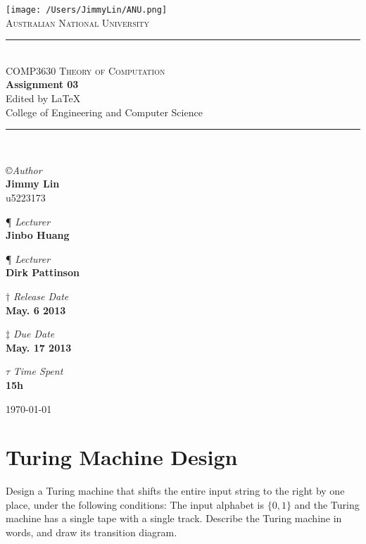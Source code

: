 \documentclass[11pt,a4paper]{article}
\newcommand{\AUTHOR}{Jimmy Lin}
\newcommand{\UID}{u5223173}
\newcommand{\UNIVERSITY}{Australian National University}
\newcommand{\COLLEGE}{College of Engineering and Computer Science}
\newcommand{\COURSE}{COMP3630 Theory of Computation}
\newcommand{\LECTURER}{Jinbo Huang}
\newcommand{\LECTURERt}{Dirk Pattinson}
\newcommand{\TASK}{Assignment 03}
\newcommand{\RELEASEDATE}{May. 6 2013}
\newcommand{\DUEDATE}{May. 17 2013}
\newcommand{\TIMECONSUME}{15h}
\begin{document}
\begin{titlepage}
    \begin{center}
        \vspace*{0.8cm}
\texttt{[image: /Users/JimmyLin/ANU.png]}\\[1cm]
\textsc{\LARGE \UNIVERSITY}\\[1.5cm]

\rule{\linewidth}{0.5mm} \\[0.4cm]
{ \textsc{\Large \COURSE}\\[0.5cm]
 \huge \bfseries \TASK}\\[0.4cm]
 \footnotesize Edited by \LaTeX \\[0.25cm]
 \normalsize{\COLLEGE}
\rule{\linewidth}{0.5mm} \\[1.5cm]

\begin{center}
\copyright \emph{\large Author} \\
\Large \textbf{\AUTHOR} \\ \UID \vspace*{0.6cm}

\P \emph{ Lecturer} \\
\Large \textbf{\LECTURER} \vspace*{0.6cm}

\P \emph{ Lecturer} \\
\Large \textbf{\LECTURERt} \vspace*{0.6cm}


$\dagger$ \emph{Release Date}  \\
\Large \textbf{\RELEASEDATE} \vspace*{0.6cm} 

$\ddagger$ \emph{Due Date}  \\
\Large \textbf{\DUEDATE} \vspace*{0.6cm}

$\tau$ \emph{Time Spent} \\
\Large \textbf{\TIMECONSUME} \vspace*{0.6cm} 
\end{center}
\vfill
{\large \today}
\end{center}
\end{titlepage}

\begin{center} \tableofcontents \end{center}
 \newpage
\section{Turing Machine Design}
Design a Turing machine that shifts the entire input string to the right by one place, under the following conditions: The input alphabet is $\{0, 1\}$ and the Turing machine has a single tape with a single track. Describe the Turing machine in words, and draw its transition diagram.
\end{document}
